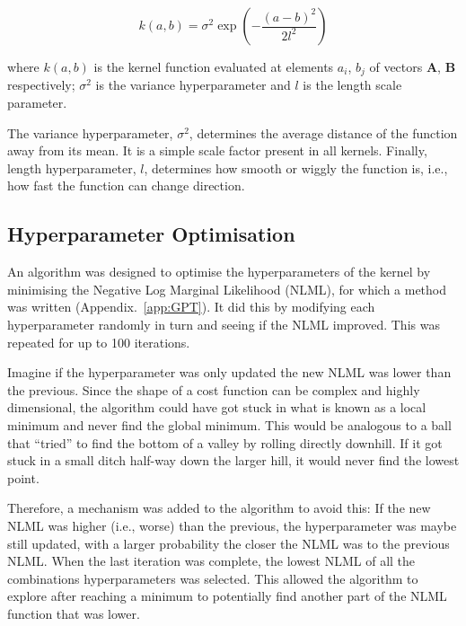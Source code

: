 \documentclass[12pt]{article}
\begin{document}
    \begin{equation}
        k(a,b) = \sigma^2 \exp\left(-\frac{(a - b)^2}{2l^2}\right) \label{eq:se-kernel}
    \end{equation}

    \noindent where $k(a,b)$ is the kernel function evaluated at elements $a_i$, $b_j$ of vectors $\mathbf{A}$, $\mathbf{B}$ respectively; $\sigma^2$ is the variance hyperparameter and $l$ is the length scale parameter.

    The variance hyperparameter, $\sigma^2$, determines the average distance of the function away from its mean.
    It is a simple scale factor present in all kernels.
    Finally, length hyperparameter, $l$, determines how smooth or wiggly the function is, i.e., how fast the function can change direction.

    \subsection{Hyperparameter Optimisation}
    An algorithm was designed to optimise the hyperparameters of the kernel by minimising the Negative Log Marginal Likelihood (NLML), for which a method was written (Appendix.~\ref{app:GPT}).
    It did this by modifying each hyperparameter randomly in turn and seeing if the NLML improved.
    This was repeated for up to 100 iterations.

    Imagine if the hyperparameter was only updated the new NLML was lower than the previous.
    Since the shape of a cost function can be complex and highly dimensional, the algorithm could have got stuck in what is known as a local minimum and never find the global minimum.
    This would be analogous to a ball that ``tried'' to find the bottom of a valley by rolling directly downhill.
    If it got stuck in a small ditch half-way down the larger hill, it would never find the lowest point.

    Therefore, a mechanism was added to the algorithm to avoid this:
    If the new NLML was higher (i.e., worse) than the previous, the hyperparameter was maybe still updated, with a larger probability the closer the NLML was to the previous NLML\@.
    When the last iteration was complete, the lowest NLML of all the combinations hyperparameters was selected.
    This allowed the algorithm to explore after reaching a minimum to potentially find another part of the NLML function that was lower.
\end{document}
